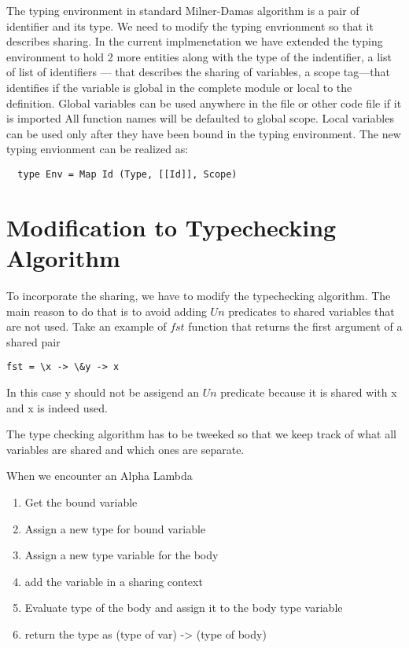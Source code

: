 The typing environment in standard Milner-Damas algorithm
is a pair of identifier and its type.
We need to modify the typing envrionment so that it describes sharing.
In the current implmenetation we have
extended the typing environment to hold 2 more entities along with the
type of the indentifier, a list of list of identifiers --- that describes the sharing of variables,
a scope tag---that identifies if the variable is global in the complete module or local to the definition.
Global variables can be used anywhere in the file or other code file if it is imported
All function names will be defaulted to global scope.
Local variables can be used only after they have been bound in the typing environment.
The new typing envionment can be realized as:
\begin{verbatim}
  type Env = Map Id (Type, [[Id]], Scope)
\end{verbatim}





\section{Modification to Typechecking Algorithm}

To incorporate the sharing, we have to modify the typechecking algorithm.
The main reason to do that is to avoid adding $Un$ predicates to
shared variables that are not used. Take an example of $fst$ function
that returns the first argument of a shared pair
\begin{verbatim}
fst = \x -> \&y -> x
\end{verbatim}
In this case y should not be assigend an $Un$ predicate because
it is shared with x and x is indeed used.

The type checking algorithm has to be tweeked so that we keep track
of what all variables are shared and which ones are separate.

When we encounter an Alpha Lambda
\begin{enumerate}
\item Get the bound variable
\item Assign a new type for bound variable
\item Assign a new type variable for the body
\item add the variable in a sharing context
\item Evaluate type of the body and assign it to the body type variable
\item return the type as (type of var) -> (type of body)
\end{enumerate}


